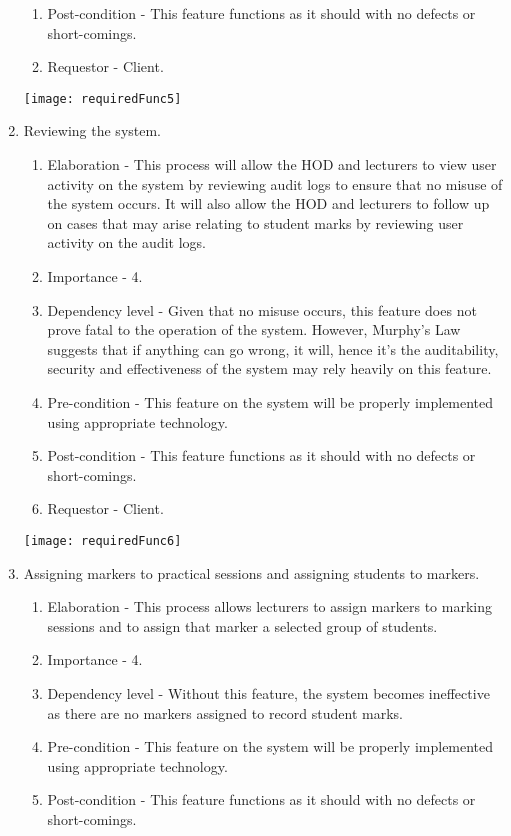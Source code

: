 \documentclass[12pt, a4paper]{scrartcl}
\begin{document}
\begin{enumerate}
\begin{enumerate}
						\item Post-condition - This feature functions as it should with no defects or short-comings.
						\item Requestor - Client.
					\end{enumerate}
					\texttt{[image: requiredFunc5]}
					\item Reviewing the system.
					\begin{enumerate}
						\item Elaboration - This process will allow the HOD and lecturers to view user activity on the system by reviewing audit logs to ensure that no misuse of the system occurs. It will also allow the HOD and lecturers to follow up on cases that may arise relating to student marks by reviewing user activity on the audit logs.
						\item Importance - 4.
						\item Dependency level - Given that no misuse occurs, this feature does not prove fatal to the operation of the system. However, Murphy’s Law suggests that if anything can go wrong, it will, hence it’s the auditability, security and effectiveness of the system may rely heavily on this feature.
						\item Pre-condition - This feature on the system will be properly implemented using appropriate technology.
						\item Post-condition - This feature functions as it should with no defects or short-comings.
						\item Requestor - Client.
					\end{enumerate}
					\texttt{[image: requiredFunc6]}
					\item Assigning markers to practical sessions and assigning students to markers.
					\begin{enumerate}
						\item Elaboration - This process allows lecturers to assign markers to marking sessions and to assign that marker a selected group of students.
						\item Importance - 4.
						\item Dependency level - Without this feature, the system becomes ineffective as there are no markers assigned to record student marks.
						\item Pre-condition - This feature on the system will be properly implemented using appropriate technology.
						\item Post-condition - This feature functions as it should with no defects or short-comings.

\end{enumerate}
\end{enumerate}
\end{document}
